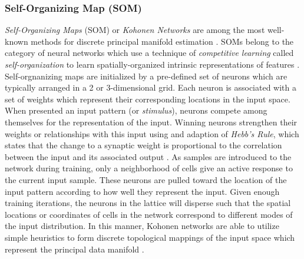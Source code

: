 \subsubsection{Self-Organizing Map (SOM)} \label{sec:SOM}

\textit{Self-Organizing Maps} (SOM) or \textit{Kohonen Networks} \citep{Kohonen1990SOM} are among the most well-known methods for discrete principal manifold estimation \citep{Yin2007SOM,Sorzano2014DRReview}.   SOMs belong to the category of neural networks which use a technique of  \textit{competitive learning} called \textit{self-organization} to learn spatially-organized intrinsic representations of features \citep{Rauber2002GHSOM}.  Self-orgnanizing maps are initialized by a pre-defined set of neurons which are typically arranged in a 2 or 3-dimensional grid.  Each neuron is associated with a set of weights which represent their corresponding locations in the input space.   When presented an input pattern (or \textit{stimulus}), neurons compete among themselves for the representation of the input. Winning neurons strengthen their weights or relationships with this input using and adaption of \textit{Hebb's Rule}, which states that the change to a synaptic weight is proportional to the correlation between the input and its associated output \citep{Rumelhart1985CHL}.  As samples are introduced to the network during training, only a neighborhood of cells give an active response to the current input sample. These neurons are pulled toward the location of the input pattern according to how well they represent the input.  Given enough training iterations, the neurons in the lattice will disperse such that the spatial locations or coordinates of cells in the network correspond to different modes of the input distribution.  In this manner, Kohonen networks are able to utilize simple heuristics to form discrete topological mappings of the input space which represent the principal data manifold \citep{Yin2007SOM}. 

